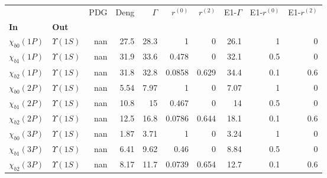 \begin{tabular}{l|l|r|r|r|r|r|r|r|r}
\toprule
                &                &  PDG &  Deng &  $\Gamma$ &  $r^{(0)}$ &  $r^{(2)}$ &  E1-$\Gamma$ &  E1-$r^{(0)}$ &  E1-$r^{(2)}$ \\
\textbf{In} & \textbf{Out} &      &       &           &            &            &              &               &               \\
\midrule
\textbf{$\chi_{b0}(1P)$} & \textbf{$\Upsilon(1S)$} &  nan &  27.5 &      28.3 &          1 &          0 &         26.1 &             1 &             0 \\
\textbf{$\chi_{b1}(1P)$} & \textbf{$\Upsilon(1S)$} &  nan &  31.9 &      33.6 &      0.478 &          0 &         32.1 &           0.5 &             0 \\
\textbf{$\chi_{b2}(1P)$} & \textbf{$\Upsilon(1S)$} &  nan &  31.8 &      32.8 &     0.0858 &      0.629 &         34.4 &           0.1 &           0.6 \\
\textbf{$\chi_{b0}(2P)$} & \textbf{$\Upsilon(1S)$} &  nan &  5.54 &      7.97 &          1 &          0 &         7.07 &             1 &             0 \\
\textbf{$\chi_{b1}(2P)$} & \textbf{$\Upsilon(1S)$} &  nan &  10.8 &        15 &      0.467 &          0 &           14 &           0.5 &             0 \\
\textbf{$\chi_{b2}(2P)$} & \textbf{$\Upsilon(1S)$} &  nan &  12.5 &      16.8 &     0.0786 &      0.644 &         18.1 &           0.1 &           0.6 \\
\textbf{$\chi_{b0}(3P)$} & \textbf{$\Upsilon(1S)$} &  nan &  1.87 &      3.71 &          1 &          0 &         3.24 &             1 &             0 \\
\textbf{$\chi_{b1}(3P)$} & \textbf{$\Upsilon(1S)$} &  nan &  6.41 &      9.62 &       0.46 &          0 &         8.84 &           0.5 &             0 \\
\textbf{$\chi_{b2}(3P)$} & \textbf{$\Upsilon(1S)$} &  nan &  8.17 &      11.7 &     0.0739 &      0.654 &         12.7 &           0.1 &           0.6 \\
\bottomrule
\end{tabular}
